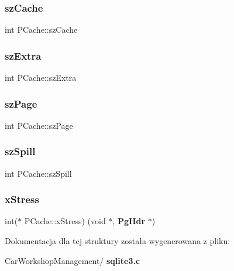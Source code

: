 \mbox{\label{struct_p_cache_a93ed4b9d731d883c3ed22a5adfd9c636}} 
\subsubsection{szCache}
{\footnotesize\ttfamily int P\+Cache\+::sz\+Cache}

\mbox{\label{struct_p_cache_abcb37fcd3ea098b98a196a3f69e3c135}} 
\subsubsection{szExtra}
{\footnotesize\ttfamily int P\+Cache\+::sz\+Extra}

\mbox{\label{struct_p_cache_abb0bd0a3292780dcc07cb59bc577990d}} 
\subsubsection{szPage}
{\footnotesize\ttfamily int P\+Cache\+::sz\+Page}

\mbox{\label{struct_p_cache_abd30c4610f4087dad64f75e6c4e1e332}} 
\subsubsection{szSpill}
{\footnotesize\ttfamily int P\+Cache\+::sz\+Spill}

\mbox{\label{struct_p_cache_a51b67ce6c17cbd7124c50d8a2d0fed50}} 
\subsubsection{xStress}
{\footnotesize\ttfamily int($\ast$ P\+Cache\+::x\+Stress) (void $\ast$, \textbf{ Pg\+Hdr} $\ast$)}



Dokumentacja dla tej struktury została wygenerowana z pliku\+:\begin{DoxyCompactItemize}
\item 
Car\+Workshop\+Management/\textbf{ sqlite3.\+c}\end{DoxyCompactItemize}
